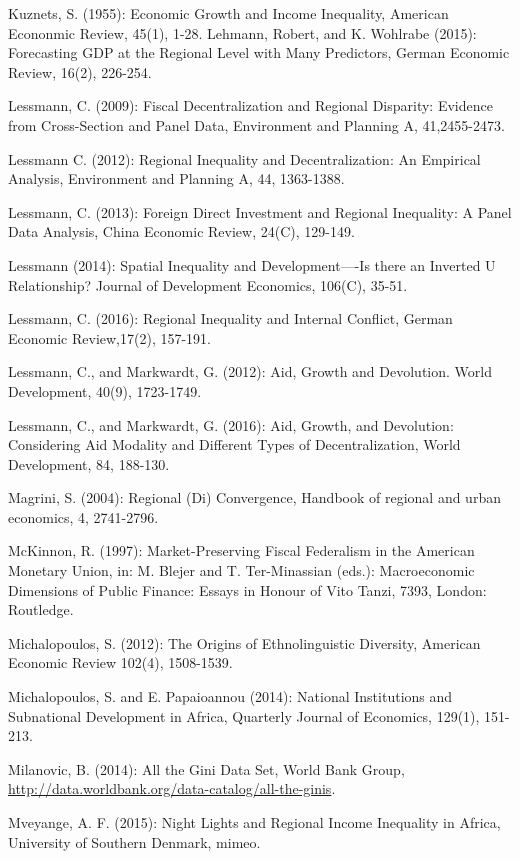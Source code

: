 \documentclass[10pt]{article}
\begin{document}
Kuznets, S. (1955): Economic Growth and Income Inequality, American Econonmic Review, 45(1), 1-28. Lehmann, Robert, and K. Wohlrabe (2015): Forecasting GDP at the Regional Level with Many Predictors, German Economic Review, 16(2), 226-254.

Lessmann, C. (2009): Fiscal Decentralization and Regional Disparity: Evidence from Cross-Section and Panel Data, Environment and Planning A, 41,2455-2473.

Lessmann C. (2012): Regional Inequality and Decentralization: An Empirical Analysis, Environment and Planning A, 44, 1363-1388.

Lessmann, C. (2013): Foreign Direct Investment and Regional Inequality: A Panel Data Analysis, China Economic Review, 24(C), 129-149.

Lessmann (2014): Spatial Inequality and Development—-Is there an Inverted U Relationship? Journal of Development Economics, 106(C), 35-51.

Lessmann, C. (2016): Regional Inequality and Internal Conflict, German Economic Review,17(2), 157-191.

Lessmann, C., and Markwardt, G. (2012): Aid, Growth and Devolution. World Development, 40(9), 1723-1749.

Lessmann, C., and Markwardt, G. (2016): Aid, Growth, and Devolution: Considering Aid Modality and Different Types of Decentralization, World Development, 84, 188-130.

Magrini, S. (2004): Regional (Di) Convergence, Handbook of regional and urban economics, 4, 2741-2796.

McKinnon, R. (1997): Market-Preserving Fiscal Federalism in the American Monetary Union, in: M. Blejer and T. Ter-Minassian (eds.): Macroeconomic Dimensions of Public Finance: Essays in Honour of Vito Tanzi, 7393, London: Routledge.

Michalopoulos, S. (2012): The Origins of Ethnolinguistic Diversity, American Economic Review 102(4), 1508-1539.

Michalopoulos, S. and E. Papaioannou (2014): National Institutions and Subnational Development in Africa, Quarterly Journal of Economics, 129(1), 151-213.

Milanovic, B. (2014): All the Gini Data Set, World Bank Group, \href{http://data.worldbank.org/data-catalog/all-the-ginis}{http://data.worldbank.org/data-catalog/all-the-ginis}.

Mveyange, A. F. (2015): Night Lights and Regional Income Inequality in Africa, University of Southern Denmark, mimeo.
\end{document}
